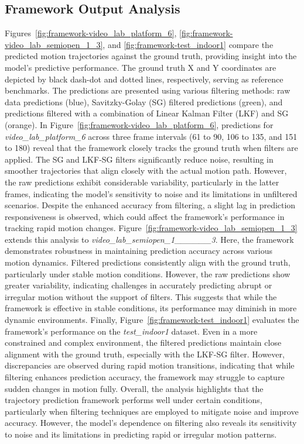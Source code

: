 \documentclass[12pt,oneside]{book} %
\begin{document}
\newpage
\subsection{Framework Output Analysis}
Figures~\ref{fig:framework-video_lab_platform_6},
\ref{fig:framework-video_lab_semiopen_1_3}, and
\ref{fig:framework-test_indoor1} compare the predicted motion trajectories
against the ground truth, providing insight into the model’s predictive
performance. The ground truth X and Y coordinates are depicted by black
dash-dot and dotted lines, respectively, serving as reference benchmarks. The
predictions are presented using various filtering methods: raw data predictions
(blue), Savitzky-Golay (SG) filtered predictions (green), and predictions
filtered with a combination of Linear Kalman Filter (LKF) and SG (orange). In
Figure~\ref{fig:framework-video_lab_platform_6}, predictions for
\textit{video\_lab\_platform\_6} across three frame intervals (61 to 90, 106 to
135, and 151 to 180) reveal that the framework closely tracks the ground truth
when filters are applied. The SG and LKF-SG filters significantly reduce noise,
resulting in smoother trajectories that align closely with the actual motion
path. However, the raw predictions exhibit considerable variability,
particularly in the latter frames, indicating the model's sensitivity to noise
and its limitations in unfiltered scenarios. Despite the enhanced accuracy from
filtering, a slight lag in prediction responsiveness is observed, which could
affect the framework’s performance in tracking rapid motion changes.
Figure~\ref{fig:framework-video_lab_semiopen_1_3} extends this analysis to
\textit{video\_lab\_semiopen\_1\_\_\_\_\_\_3}. Here, the framework demonstrates
robustness in maintaining prediction accuracy across various motion dynamics.
Filtered predictions consistently align with the ground truth, particularly
under stable motion conditions. However, the raw predictions show greater
variability, indicating challenges in accurately predicting abrupt or irregular
motion without the support of filters. This suggests that while the framework
is effective in stable conditions, its performance may diminish in more dynamic
environments. Finally, Figure~\ref{fig:framework-test_indoor1} evaluates the
framework's performance on the \textit{test\_indoor1} dataset. Even in a more
constrained and complex environment, the filtered predictions maintain close
alignment with the ground truth, especially with the LKF-SG filter. However,
discrepancies are observed during rapid motion transitions, indicating that
while filtering enhances prediction accuracy, the framework may struggle to
capture sudden changes in motion fully. Overall, the analysis highlights that
the trajectory prediction framework performs well under certain conditions,
particularly when filtering techniques are employed to mitigate noise and
improve accuracy. However, the model's dependence on filtering also reveals its
sensitivity to noise and its limitations in predicting rapid or irregular
motion patterns. 
\end{document}
